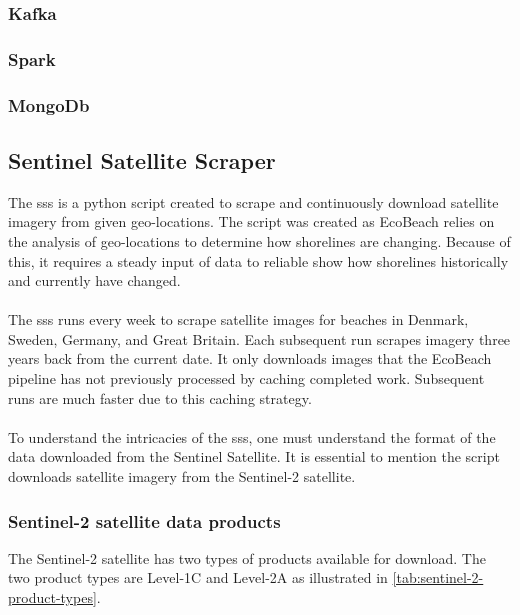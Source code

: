 \subsubsection{Kafka}

\subsubsection{Spark}

\subsubsection{MongoDb}

\subsection{Sentinel Satellite Scraper}\label{subsec:sentinel-satellite-scraper}
The \acrfull{sss} is a python script created to scrape and continuously download satellite imagery from given geo-locations. The script was created as EcoBeach relies on the analysis of geo-locations to determine how shorelines are changing. Because of this, it requires a steady input of data to reliable show how shorelines historically and currently have changed.\\\\
\noindent
The \acrshort{sss} runs every week to scrape satellite images for beaches in Denmark, Sweden, Germany, and Great Britain. Each subsequent run scrapes imagery three years back from the current date. It only downloads images that the EcoBeach pipeline has not previously processed by caching completed work. Subsequent runs are much faster due to this caching strategy. \\\\
\noindent
To understand the intricacies of the \acrshort{sss}, one must understand the format of the data downloaded from the Sentinel Satellite. It is essential to mention the script downloads satellite imagery from the Sentinel-2 satellite.

\subsubsection{Sentinel-2 satellite data products}

The Sentinel-2 satellite has two types of products available for download. The two product types are Level-1C and Level-2A as illustrated in \autoref{tab:sentinel-2-product-types}.

